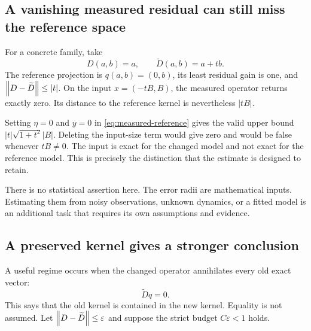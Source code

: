 \subsection{A vanishing measured residual can still miss the reference space}
For a concrete family, take
\[
 D(a,b)=a,\qquad \widetilde D(a,b)=a+tb.
\]
The reference projection is \(q(a,b)=(0,b)\), its least residual gain is one, and \(\left\lVert D-\widetilde D\right\rVert\le|t|\). On the input \(x=(-tB,B)\), the measured operator returns exactly zero. Its distance to the reference kernel is nevertheless \(|tB|\).

Setting \(\eta=0\) and \(y=0\) in \eqref{eq:measured-reference} gives the valid upper bound \(|t|\sqrt{1+t^2}|B|\). Deleting the input-size term would give zero and would be false whenever \(tB\ne0\). The input is exact for the changed model and not exact for the reference model. This is precisely the distinction that the estimate is designed to retain.

There is no statistical assertion here. The error radii are mathematical inputs. Estimating them from noisy observations, unknown dynamics, or a fitted model is an additional task that requires its own assumptions and evidence.

\subsection{A preserved kernel gives a stronger conclusion}
A useful regime occurs when the changed operator annihilates every old exact vector:
\[
 \widetilde D q=0.
\]
This says that the old kernel is contained in the new kernel. Equality is not assumed. Let \(\left\lVert D-\widetilde D\right\rVert\le\varepsilon\) and suppose the strict budget \(C\varepsilon<1\) holds.

